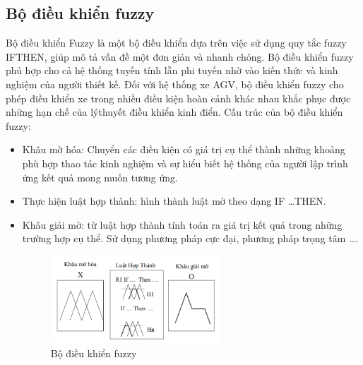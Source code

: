     \subsection{Bộ điều khiển fuzzy}
    \hspace*{0.6cm} Bộ điều khiển Fuzzy là một bộ điều khiển dựa trên việc sử dụng quy tắc fuzzy IFTHEN, giúp mô tả vấn đề một đơn giản và nhanh chóng. Bộ điều khiển fuzzy phủ hợp
    cho cả hệ thống tuyến tính lẫn phi tuyến nhờ vào kiến thức và kinh nghiệm của người
    thiết kế. Đối với hệ thống xe AGV, bộ điều khiển fuzzy cho phép điều khiển xe trong
    nhiều điều kiện hoàn cảnh khác nhau khắc phục được những hạn chế của lýthuyết điều
    khiển kinh điển.
    \newline
    \hspace*{0.6cm} Cấu trúc của bộ điều khiển fuzzy:
    \begin{itemize}[label=\textendash]
        \item Khâu mờ hóa: Chuyển các điều kiện có giá trị cụ thể thành những khoảng phù
        hợp thao tác kinh nghiệm và sự hiểu biết hệ thống của người lập trình ứng kết quả mong
        muốn tương ứng.
        \item Thực hiện luật hợp thành: hình thành luật mờ theo dạng IF \dots THEN.
        \item Khâu giải mờ: từ luật hợp thành tính toán ra giá trị kết quả trong những trường
        hợp cụ thể. Sử dụng phương pháp cực đại, phương pháp trọng tâm \dots.
        \begin{figure}[H]
            \centering
            \includegraphics[width=0.6\textwidth]{pictures/chapter1/chapter1_pic21_fuzzy.png}
            \caption{Bộ điều khiển fuzzy}
            \label{chap1_pic21}
        \end{figure}          
    \end{itemize}

